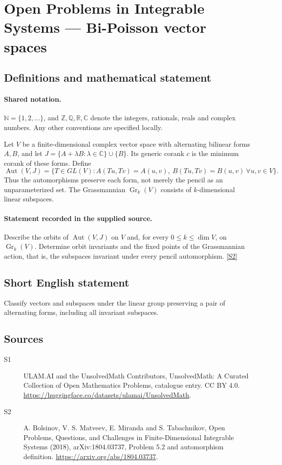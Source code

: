 \documentclass[11pt]{article}
\newcommand{\sref}[2]{\hyperlink{source:#1:#2}{[S#2]}}
\begin{document}
\section{Open Problems in Integrable Systems — Bi-Poisson vector spaces}\label{statement}

\subsection{Definitions and mathematical statement}

\paragraph{Shared notation.}$\mathbb N=\{1,2,\ldots\}$, and $\mathbb Z,\mathbb Q,\mathbb R,\mathbb C$ denote the integers, rationals, reals and complex numbers. Any other conventions are specified locally.


Let $V$ be a finite-dimensional complex vector space with alternating bilinear forms $A,B$, and let $J=\{A+\lambda B:\lambda\in\mathbb C\}\cup\{B\}$. Its generic corank $c$ is the minimum corank of these forms. Define \[\operatorname{Aut}(V,J)=\{T\in GL(V):A(Tu,Tv)=A(u,v),\ B(Tu,Tv)=B(u,v)\ \forall u,v\in V\}.\] Thus the automorphisms preserve each form, not merely the pencil as an unparameterized set. The Grassmannian $\operatorname{Gr}_k(V)$ consists of $k$-dimensional linear subspaces.
\paragraph{Statement recorded in the supplied source.}
Describe the orbits of $\operatorname{Aut}(V,J)$ on $V$ and, for every $0\le k\le\dim V$, on $\operatorname{Gr}_k(V)$. Determine orbit invariants and the fixed points of the Grassmannian action, that is, the subspaces invariant under every pencil automorphism. \sref{statement}{2}
\subsection{Short English statement}
Classify vectors and subspaces under the linear group preserving a pair of alternating forms, including all invariant subspaces.
\subsection{Sources}
\begin{description}
\item[\hypertarget{source:statement:1}{S1}] ULAM.AI and the UnsolvedMath Contributors, UnsolvedMath: A Curated Collection of Open Mathematics Problems, catalogue entry. CC BY 4.0. \url{https://huggingface.co/datasets/ulamai/UnsolvedMath}.
\item[\hypertarget{source:statement:2}{S2}] A. Bolsinov, V. S. Matveev, E. Miranda and S. Tabachnikov, Open Problems, Questions, and Challenges in Finite-Dimensional Integrable Systems (2018), arXiv:1804.03737, Problem 5.2 and automorphism definition. \url{https://arxiv.org/abs/1804.03737}.
\end{description}
\label{end:statement}
\end{document}

